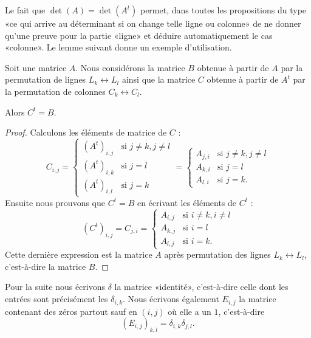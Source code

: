 Le fait que \( \det(A)=\det(A^t)\) permet, dans toutes les propositions du type «ce qui arrive au déterminant si on change telle ligne ou colonne» de ne donner qu'une preuve pour la partie «ligne» et déduire automatiquement le cas «colonne». Le lemme suivant donne un exemple d'utilisation.

\begin{lemma}        \label{LEMooWMQWooGWFlmC}
	Soit une matrice \( A\). Nous considérons la matrice \( B\) obtenue à partir de \( A\) par la permutation de lignes \( L_k\leftrightarrow L_l\) ainsi que la matrice \( C\) obtenue à partir de \( A^t\) par la permutation de colonnes \( C_k\leftrightarrow C_l\).

	Alors \( C^t=B\).
\end{lemma}

\begin{proof}
	Calculons les éléments de matrice de \( C\) :
	\begin{equation}
		C_{i,j}=\begin{cases}
			(A^t)_{i,j} & \text{si }  j\neq k, j\neq l \\
			(A^t)_{i,k} & \text{si }  j=l              \\
			(A^t)_{i,l} & \text{si }  j=k
		\end{cases}=
		\begin{cases}
			A_{j,i} & \text{si }  j\neq k, j\neq l \\
			A_{k,i} & \text{si }  j=l              \\
			A_{l,i} & \text{si }  j=k.
		\end{cases}
	\end{equation}
	Ensuite nous prouvons que \( C^t=B\) en écrivant les éléments de \( C^t\) :
	\begin{equation}
		(C^t)_{i,j}=C_{j,i}=\begin{cases}
			A_{i,j} & \text{si } i\neq k, i\neq l \\
			A_{k,j} & \text{si } i=l              \\
			A_{l,j} & \text{si } i=k.
		\end{cases}
	\end{equation}
	Cette dernière expression est la matrice \( A\) après permutation des lignes \( L_k\leftrightarrow L_l\), c'est-à-dire la matrice \( B\).
\end{proof}

Pour la suite nous écrivons \( \delta\) la matrice «identité», c'est-à-dire celle dont les entrées sont précisément les \( \delta_{i,k}\).  Nous écrivons également \( E_{i,j}\) la matrice contenant des zéros partout sauf en \( (i,j)\) où elle a un \( 1\), c'est-à-dire
\begin{equation}
	(E_{i,j})_{k,l}=\delta_{i,k}\delta_{j,l}.
\end{equation}

